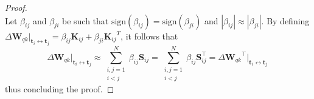 \begin{proof}
\begin{equation}
\end{equation}
%
Let $\beta_{ij}$ and $\beta_{ji}$ be such that $\text{sign}(\beta_{ij}) = \text{sign}(\beta_{ji})$ and $|\beta_{ij}| \approx $$|\beta_{ji}|$.
%
By defining $\Delta \bm{W}_{qk}\big|_{\bm{t}_i \leftrightarrow \bm{t}_j} = \beta_{ij}\bm{K}
_{ij} + \beta_{ji}{\bm{K}_{ij}}^T$,
%
it follows that
%
\begin{equation}
 \Delta \bm{W}_{qk}\big|_{\bm{t}_i \leftrightarrow \bm{t}_j} \approx \sum_{\substack{i,j = 1 \\ i < j}}^N \beta_{ij}\bm{S}_{ij} = \sum_{\substack{i,j = 1 \\ i < j}}^N \beta_{ij}{\bm{S}}^\top_{ij} = \Delta {\bm{W}_{qk}}^\top\big|_{\bm{t}_i \leftrightarrow \bm{t}_j} \,
\end{equation}
%
thus concluding the proof.
%
\end{proof}